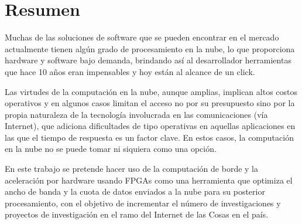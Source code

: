 \chapter*{Resumen}

Muchas de las soluciones de software que se pueden encontrar en el mercado actualmente tienen algún grado de procesamiento en la nube, lo que proporciona hardware y software bajo demanda, brindando así al desarrollador herramientas que hace 10 años eran impensables y hoy están al alcance de un click.

Las virtudes de la computación en la nube, aunque amplias, implican altos costos operativos y en algunos casos limitan el acceso no por su presupuesto sino por la propia naturaleza de la tecnología involucrada en las comunicaciones (vía Internet), que adiciona dificultades de tipo operativas en aquellas aplicaciones en las que el tiempo de respuesta es un factor clave. En estos casos, la computación en la nube no se puede tomar ni siquiera como una opción.

En este trabajo se pretende hacer uso de la computación de borde y la aceleración por hardware usando FPGAs como una herramienta que optimiza el ancho de banda y la cuota de datos enviados a la nube para su posterior procesamiento, con el objetivo de incrementar el número de investigaciones y proyectos de investigación en el ramo del Internet de las Cosas en el país.
